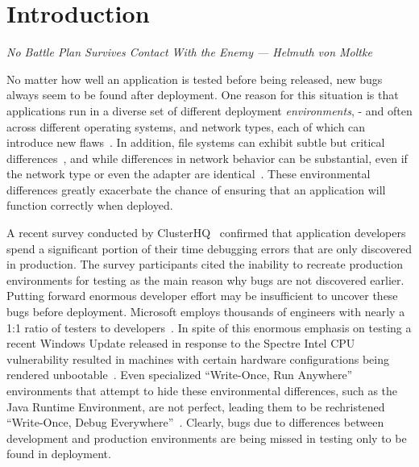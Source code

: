 \section{Introduction}
\label{SEC:introduction}
\textit{No Battle Plan Survives Contact With the Enemy --- Helmuth von Moltke}

No matter how well an application is tested before being released, new bugs
always seem to be found after deployment.  One reason for this situation
is that applications run in a diverse set of
different deployment \emph{environments}, - and often
across different operating systems, and network types,
each of which can introduce new flaws~\cite{LinuxGlibcChanges}.
In addition, file
systems can exhibit subtle but critical
differences~\cite{EXT4Layout, AppleHFS}, and while differences in network
behavior can
be substantial, even if the network type or even the
adapter are identical~\cite{vbox}. These environmental differences greatly
exacerbate the chance of ensuring that an application will function
correctly when deployed.

A recent survey conducted by ClusterHQ~\cite{ClusterHQSurvey} confirmed
that application developers spend a significant portion of their time
debugging errors that are only discovered in production.  The survey
participants cited the inability to recreate production environments for
testing as the main reason why bugs are not discovered earlier.  Putting
forward enormous developer effort may be insufficient to uncover these bugs
before deployment.  Microsoft employs thousands of engineers with nearly a
1:1 ratio of testers to developers~\cite{Page2009}.  In spite of this
enormous emphasis on testing a recent Windows Update released in response
to the Spectre Intel CPU vulnerability resulted in machines with certain
hardware configurations being rendered unbootable~\cite{kb4056892}.  Even
specialized ``Write-Once, Run Anywhere'' environments that attempt to hide
these environmental differences, such as the Java Runtime Environment, are
not perfect, leading them to be rechristened ``Write-Once, Debug
Everywhere''~\cite{WODE}.  Clearly, bugs due to differences between
development and production environments are being missed in testing only to
be found in deployment.

